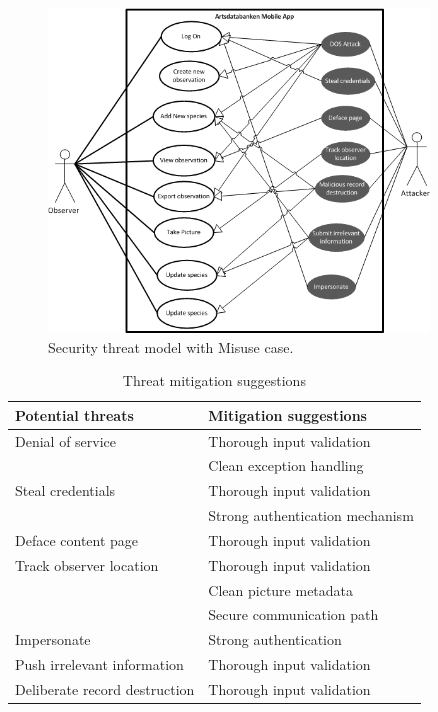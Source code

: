 \begin{figure}[htb]
	\centering
    \includegraphics[width=0.9\textwidth]{reqspec/misusecase.png}
	\caption{Security threat model with Misuse case.}
	\label{fig:misusecase}
\end{figure}

\begin{table}[htb]
	\centering
    \begin{tabular}{| l | l |}
		\hline
		Potential threats & Mitigation suggestions \\
		\hline \hline
		Denial of service	& Thorough input validation \\& Clean exception handling \\
		Steal credentials	& Thorough input validation\\	& Strong authentication mechanism \\
        Deface content page & Thorough input validation\\
        Track observer location & Thorough input validation\\ & Clean picture metadata\\ & Secure communication path\\
        Impersonate & Strong authentication\\
        Push irrelevant information & Thorough input validation\\
        Deliberate record destruction & Thorough input validation\\

		\hline
    \end{tabular}
  \caption{Threat mitigation suggestions}
\end{table}
